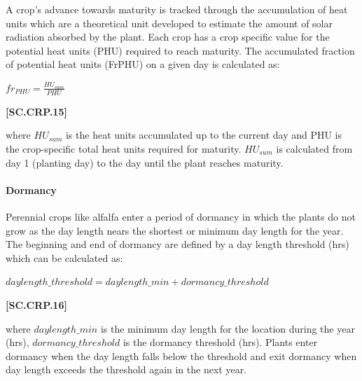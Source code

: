 A crop’s advance towards maturity is tracked through the accumulation of heat units which are a theoretical unit developed to estimate the amount of solar radiation absorbed by the plant. Each crop has a crop specific value for the potential heat units (PHU) required to reach maturity. The accumulated fraction of potential heat units (FrPHU) on a given day is calculated as:
    \vspace{0.2cm}

    \begin{center}
        \(fr_{PHU} = \frac{HU_{sum}}{PHU}	\)
    \end{center}
        \vspace{0.5cm}
    
            {\raggedleft \textbf{[SC.CRP.15]}\par}
            \vspace{0.5cm}

where \(HU_{sum}\) is the heat units accumulated up to the current day and PHU is the crop-specific total heat units required for maturity. \(HU_{sum}\) is calculated from day 1 (planting day) to the day until the plant reaches maturity. 

\paragraph{Dormancy}
\vspace{-0.25cm}

Perennial crops like alfalfa enter a period of dormancy in which the plants do not grow as the day length nears the shortest or minimum day length for the year. The beginning and end of dormancy are defined by a day length threshold (hrs) which can be calculated as:
    \vspace{0.2cm}

    \begin{center}
        \(daylength\_threshold=daylength\_min+dormancy\_threshold\)
    \end{center}
        \vspace{0.5cm}
    
            {\raggedleft \textbf{[SC.CRP.16]}\par}
            \vspace{0.5cm}

where \(daylength\_min\) is the minimum day length for the location during the year (hrs), \(dormancy\_threshold\) is the dormancy threshold (hrs). Plants enter dormancy when the day length falls below the threshold and exit dormancy when day length exceeds the threshold again in the next year.

